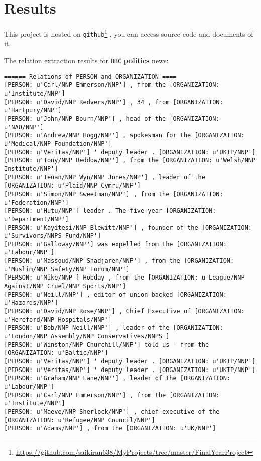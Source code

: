 \documentclass[12pt]{report}
\begin{document}
\section{Results}
\par This project is hosted on \texttt{github}\footnote{\url{https://github.com/saikiran638/MyProjects/tree/master/FinalYearProject}}
, you can access source code and documents of it.
\par The relation extraction results for \texttt{BBC} \textbf{politics} news:
\begin{scriptsize}
\begin{verbatim}
====== Relations of PERSON and ORGANIZATION ====
[PERSON: u'Carl/NNP Emmerson/NNP'] , from the [ORGANIZATION: u'Institute/NNP']
[PERSON: u'David/NNP Redvers/NNP'] , 34 , from [ORGANIZATION: u'Hartpury/NNP']
[PERSON: u'John/NNP Bourn/NNP'] , head of the [ORGANIZATION: u'NAO/NNP']
[PERSON: u'Andrew/NNP Hogg/NNP'] , spokesman for the [ORGANIZATION: u'Medical/NNP Foundation/NNP']
[PERSON: u'Veritas/NNP'] ' deputy leader . [ORGANIZATION: u'UKIP/NNP']
[PERSON: u'Tony/NNP Beddow/NNP'] , from the [ORGANIZATION: u'Welsh/NNP Institute/NNP']
[PERSON: u'Ieuan/NNP Wyn/NNP Jones/NNP'] , leader of the [ORGANIZATION: u'Plaid/NNP Cymru/NNP']
[PERSON: u'Simon/NNP Sweetman/NNP'] , from the [ORGANIZATION: u'Federation/NNP']
[PERSON: u'Hutu/NNP'] leader . The five-year [ORGANIZATION: u'Department/NNP']
[PERSON: u'Kayitesi/NNP Blewitt/NNP'] , founder of the [ORGANIZATION: u'Survivors/NNPS Fund/NNP']
[PERSON: u'Galloway/NNP'] was expelled from the [ORGANIZATION: u'Labour/NNP']
[PERSON: u'Massoud/NNP Shadjareh/NNP'] , from the [ORGANIZATION: u'Muslim/NNP Safety/NNP Forum/NNP']
[PERSON: u'Mike/NNP'] Hobday , from the [ORGANIZATION: u'League/NNP Against/NNP Cruel/NNP Sports/NNP']
[PERSON: u'Neill/NNP'] , editor of union-backed [ORGANIZATION: u'Hazards/NNP']
[PERSON: u'David/NNP Rose/NNP'] , Chief Executive of [ORGANIZATION: u'Hereford/NNP Hospitals/NNP']
[PERSON: u'Bob/NNP Neill/NNP'] , leader of the [ORGANIZATION: u'London/NNP Assembly/NNP Conservatives/NNPS']
[PERSON: u'Winston/NNP Churchill/NNP'] told us - from the [ORGANIZATION: u'Baltic/NNP']
[PERSON: u'Veritas/NNP'] ' deputy leader . [ORGANIZATION: u'UKIP/NNP']
[PERSON: u'Veritas/NNP'] ' deputy leader . [ORGANIZATION: u'UKIP/NNP']
[PERSON: u'Graham/NNP Lane/NNP'] , leader of the [ORGANIZATION: u'Labour/NNP']
[PERSON: u'Carl/NNP Emmerson/NNP'] , from the [ORGANIZATION: u'Institute/NNP']
[PERSON: u'Maeve/NNP Sherlock/NNP'] , chief executive of the [ORGANIZATION: u'Refugee/NNP Council/NNP']
[PERSON: u'Adams/NNP'] , from the [ORGANIZATION: u'UK/NNP']

\end{verbatim}
\end{scriptsize}
\end{document}
